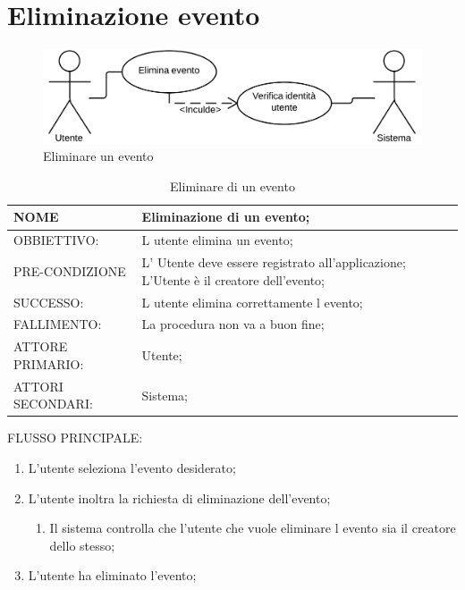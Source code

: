 \section{Eliminazione evento}
\begin{figure}[H]
\centering
\includegraphics[scale=0.30]{img/use/Elimina.png}
\caption{Eliminare un evento}
\label{fig:Elimina}
\end{figure}
\begin{table}[H]
\begin{tabular}{p{}|p{}}
\toprule
NOME & Eliminazione di un evento;\\
\hline
OBBIETTIVO: & L utente elimina un evento;\\
\hline
PRE-CONDIZIONE & L' Utente deve essere registrato all'applicazione;
L'Utente è il creatore dell'evento;\\
\hline
SUCCESSO: & L utente elimina correttamente l evento;\\
\hline
FALLIMENTO: & La procedura non va a buon fine;\\
\hline
ATTORE PRIMARIO: & Utente;\\
\hline
ATTORI SECONDARI: & Sistema;\\
\bottomrule
\end{tabular}
\caption{Eliminare di un evento}
\label{table:elimina}
\end{table}	
FLUSSO PRINCIPALE:
\begin{enumerate}
\item L'utente seleziona l'evento desiderato;
\item L'utente inoltra la richiesta di eliminazione dell'evento;
\begin{enumerate}
\item Il sistema controlla che l'utente che vuole eliminare l evento sia il creatore dello stesso;
\end{enumerate}
\item L'utente ha eliminato l'evento;
\end{enumerate}

